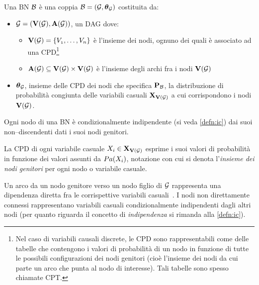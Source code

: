 \begin{definizione}[\acl{BN}]
\label{defn:bn}
Una \acl{BN} $\mathcal{B}$ è una coppia $\mathcal{B}=(\mathcal{G},\boldsymbol{\textbf{\text{$\theta$}}}_{\mathcal{G}})$ costituita da:
\begin{itemize}
    \item $\mathcal{G}=(\mathbf{V}(\mathcal{G}),\mathbf{A}(\mathcal{G}))$, un \acl{DAG} dove:
    \begin{itemize}
        \item $\mathbf{V}(\mathcal{G})=\{\mathnormal{V_1}, \dotsc, \mathnormal{V_n}\}$ è l'insieme dei nodi, ognuno dei quali è associato ad una \acf{CPD}\footnote{Nel caso di variabili causali discrete, le \acs{CPD} sono rappresentabili come delle tabelle che contengono i valori di probabilità di un nodo in funzione di tutte le possibili configurazioni dei nodi genitori (cioè l'insieme dei nodi da cui parte un arco che punta al nodo di interesse). Tali tabelle sono spesso chiamate \acf{CPT}.}
        \item $\mathbf{A}(\mathcal{G})\subseteq\mathbf{V}(\mathcal{G})\times\mathbf{V}(\mathcal{G})$ è l'insieme degli archi fra i nodi $\mathbf{V}(\mathcal{G})$
    \end{itemize}
    \item $\boldsymbol{\textbf{\text{$\theta$}}}_{\mathcal{G}}$, insieme delle \acs{CPD} dei nodi che specifica $\mathbf{P}_{\mathcal{B}}$, la distribuzione di probabilità congiunta delle variabili casuali $\mathbf{X}_{\mathbf{V}(\mathcal{G})}$ a cui corrispondono i nodi $\mathbf{V}(\mathcal{G})$.
\end{itemize}
\end{definizione}
\begin{osservazione}\label{oss:bn-markov-assumption}
Ogni nodo di una \acs{BN} è condizionalmente indipendente (si veda \autoref{defn:ic}) dai suoi non--discendenti dati i suoi nodi genitori.
\end{osservazione}

La \acs{CPD} di ogni variabile casuale $\mathnormal{X_i}\in\mathbf{X}_{\mathbf{V}(\mathcal{G})}$ esprime i suoi valori di probabilità in funzione dei valori assunti da $Pa(\mathnormal{X_i})$, notazione con cui si denota l'\emph{insieme dei nodi genitori} per ogni nodo o variabile casuale.

Un arco da un nodo genitore verso un nodo figlio di $\mathcal{G}$ rappresenta una dipendenza diretta fra le corrispettive variabili casuali~\citep[si veda][sezione 14.1]{Russel2003}. I nodi non direttamente connessi rappresentano variabili casuali condizionalmente indipendenti dagli altri nodi (per quanto riguarda il concetto di \emph{indipendenza \cond*{}} si rimanda alla \autoref{defn:ic}).

